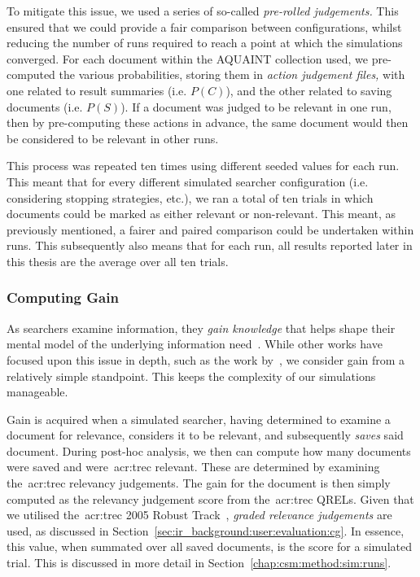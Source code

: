 To mitigate this issue, we used a series of so-called \emph{pre-rolled judgements.} This ensured that we could provide a fair comparison between configurations, whilst reducing the number of runs required to reach a point at which the simulations converged. For each document within the AQUAINT collection used, we pre-computed the various probabilities, storing them in \emph{action judgement files,} with one related to result summaries (i.e. $P(C)$), and the other related to saving documents (i.e. $P(S)$). If a document was judged to be relevant in one run, then by pre-computing these actions in advance, the same document would then be considered to be relevant in other runs.

This process was repeated ten times using different seeded values for each run. This meant that for every different simulated searcher configuration (i.e. considering stopping strategies, etc.), we ran a total of ten trials in which documents could be marked as either relevant or non-relevant. This meant, as previously mentioned, a fairer and paired comparison could be undertaken within runs. This subsequently also means that for each run, all results reported later in this thesis are the average over all ten trials. 

\subsubsection{Computing Gain}\label{chap:csm:method:simulation:grounding:gain}
As searchers examine information, they \emph{gain knowledge} that helps shape their mental model of the underlying information need~\citep{nickles1995judgment}. While other works have focused upon this issue in depth, such as the work by~\cite{baskaya2013behavioural_factors}, we consider gain from a relatively simple standpoint. This keeps the complexity of our simulations manageable.

Gain is acquired when a simulated searcher, having determined to examine a document for relevance, considers it to be relevant, and subsequently \emph{saves} said document. During post-hoc analysis, we then can compute how many documents were saved and were~\gls{acr:trec} relevant. These are determined by examining the~\gls{acr:trec} relevancy judgements. The gain for the document is then simply computed as the relevancy judgement score from the~\gls{acr:trec} QRELs. Given that we utilised the~\gls{acr:trec} 2005 Robust Track~\citep{voorhees2006trec_robust}, \emph{graded relevance judgements} are used, as discussed in Section~\ref{sec:ir_background:user:evaluation:cg}. In essence, this value, when summated over all saved documents, is the  score for a simulated trial. This is discussed in more detail in Section~\ref{chap:csm:method:sim:runs}.

